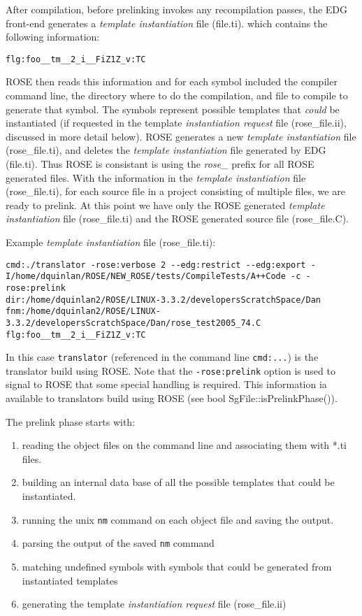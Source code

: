{After compilation, before prelinking invokes any recompilation passes,
the EDG front-end generates a {\em template instantiation} file (file.ti).
which contains the following information:

{\indent
{\mySmallFontSize

\begin{verbatim}
flg:foo__tm__2_i__FiZ1Z_v:TC
\end{verbatim}
}}

ROSE then reads this information and for each symbol included the compiler command line,
the directory where to do the compilation, and file to compile to generate that symbol.
The symbols represent possible templates that {\em could} be instantiated (if requested 
in the template {\em instantiation request} file (rose\_file.ii), discussed in more 
detail below).  ROSE generates a new {\em template instantiation} file (rose\_file.ti),
and deletes the {\em template instantiation} file generated by EDG (file.ti).  Thus ROSE
is consistant is using the {\em rose\_} prefix for all ROSE generated files.  With
the information in the {\em template instantiation} file (rose\_file.ti), for each source
file in a project consisting of multiple files, we are ready to prelink.  At this point
we have only the ROSE generated {\em template instantiation} file (rose\_file.ti) and the
ROSE generated source file (rose\_file.C).

Example {\em template instantiation} file (rose\_file.ti):

{\indent
{\mySmallFontSize

\begin{verbatim}
cmd:./translator -rose:verbose 2 --edg:restrict --edg:export -I/home/dquinlan/ROSE/NEW_ROSE/tests/CompileTests/A++Code -c -rose:prelink
dir:/home/dquinlan2/ROSE/LINUX-3.3.2/developersScratchSpace/Dan
fnm:/home/dquinlan2/ROSE/LINUX-3.3.2/developersScratchSpace/Dan/rose_test2005_74.C
flg:foo__tm__2_i__FiZ1Z_v:TC
\end{verbatim}
}}

In this case {\tt translator} (referenced in the command line {\tt cmd:...}) is the 
translator build using ROSE. Note that the {\tt -rose:prelink} option is used to signal 
to ROSE that some special handling is required.  This information ia available to
translators build using ROSE (see bool SgFile::isPrelinkPhase()).

   The prelink phase starts with:
\begin{enumerate}
   \item reading the object files on the command line and associating them with *.ti files.  
   \item building an internal data base of all the possible templates that could be instantiated.
   \item running the unix {\tt nm} command on each object file and saving the output.
   \item parsing the output of the saved {\tt nm} command
   \item matching undefined symbols with symbols that could be generated from instantiated templates
   \item generating the template {\em instantiation request} file (rose\_file.ii)
\end{enumerate}

}
